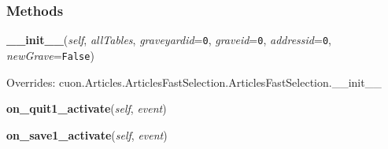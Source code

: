 
  \subsubsection{Methods}

    \vspace{0.5ex}

\hspace{.8\funcindent}\begin{boxedminipage}{\funcwidth}

    \raggedright \textbf{\_\_init\_\_}(\textit{self}, \textit{allTables}, \textit{graveyardid}={\tt 0}, \textit{graveid}={\tt 0}, \textit{addressid}={\tt 0}, \textit{newGrave}={\tt False})

\setlength{\parskip}{2ex}
\setlength{\parskip}{1ex}
      Overrides: cuon.Articles.ArticlesFastSelection.ArticlesFastSelection.\_\_init\_\_

    \end{boxedminipage}

    \label{cuon:Graves:grave:graveswindow:on_quit1_activate}

    \vspace{0.5ex}

\hspace{.8\funcindent}\begin{boxedminipage}{\funcwidth}

    \raggedright \textbf{on\_quit1\_activate}(\textit{self}, \textit{event})

\setlength{\parskip}{2ex}
\setlength{\parskip}{1ex}
    \end{boxedminipage}

    \label{cuon:Graves:grave:graveswindow:on_save1_activate}

    \vspace{0.5ex}

\hspace{.8\funcindent}\begin{boxedminipage}{\funcwidth}

    \raggedright \textbf{on\_save1\_activate}(\textit{self}, \textit{event})

\setlength{\parskip}{2ex}
\setlength{\parskip}{1ex}
    \end{boxedminipage}

